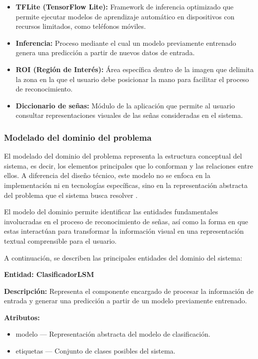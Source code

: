 \begin{itemize}
		\item \textbf{TFLite (TensorFlow Lite):} Framework de inferencia optimizado que permite ejecutar modelos de aprendizaje automático en dispositivos con recursos limitados, como teléfonos móviles.
		
		\item \textbf{Inferencia:} Proceso mediante el cual un modelo previamente entrenado genera una predicción a partir de nuevos datos de entrada.
		
		\item \textbf{ROI (Región de Interés):} Área específica dentro de la imagen que delimita la zona en la que el usuario debe posicionar la mano para facilitar el proceso de reconocimiento.
		
		\item \textbf{Diccionario de señas:} Módulo de la aplicación que permite al usuario consultar representaciones visuales de las señas consideradas en el sistema.
		
	\end{itemize}
	
	\subsubsection{Modelado del dominio del problema}
	
	El modelado del dominio del problema representa la estructura conceptual del sistema, es decir, los elementos principales que lo conforman y las relaciones entre ellos. A diferencia del diseño técnico, este modelo no se enfoca en la implementación ni en tecnologías específicas, sino en la representación abstracta del problema que el sistema busca resolver \cite{sommerville2016,pressman2014}.
	
	El modelo del dominio permite identificar las entidades fundamentales involucradas en el proceso de reconocimiento de señas, así como la forma en que estas interactúan para transformar la información visual en una representación textual comprensible para el usuario.
	
	A continuación, se describen las principales entidades del dominio del sistema:
	
	\textbf{Entidad: ClasificadorLSM}
	
	\textbf{Descripción:} Representa el componente encargado de procesar la información de entrada y generar una predicción a partir de un modelo previamente entrenado.
	
	\textbf{Atributos:}
	\begin{itemize}
		\item modelo — Representación abstracta del modelo de clasificación.
		\item etiquetas — Conjunto de clases posibles del sistema.
	\end{itemize}
	
